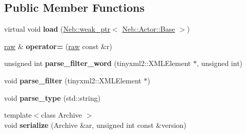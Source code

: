 \subsection*{\-Public \-Member \-Functions}
\begin{DoxyCompactItemize}
\item 
\hypertarget{classNeb_1_1Actor_1_1raw_a0fcd65e0d34cf23f105875907e84d365}{virtual void {\bfseries load} (\hyperlink{classNeb_1_1weak__ptr}{\-Neb\-::weak\-\_\-ptr}$<$ \hyperlink{classNeb_1_1Actor_1_1Base}{\-Neb\-::\-Actor\-::\-Base} $>$)}\label{classNeb_1_1Actor_1_1raw_a0fcd65e0d34cf23f105875907e84d365}

\item 
\hypertarget{classNeb_1_1Actor_1_1raw_aaa1450b77b3b9eddaed3acbeb1979f2c}{\hyperlink{classNeb_1_1Actor_1_1raw}{raw} \& {\bfseries operator=} (\hyperlink{classNeb_1_1Actor_1_1raw}{raw} const \&r)}\label{classNeb_1_1Actor_1_1raw_aaa1450b77b3b9eddaed3acbeb1979f2c}

\item 
\hypertarget{classNeb_1_1Actor_1_1raw_a4754eca5b0d5288e337c4ba427b6f22f}{unsigned int {\bfseries parse\-\_\-filter\-\_\-word} (tinyxml2\-::\-X\-M\-L\-Element $\ast$, unsigned int)}\label{classNeb_1_1Actor_1_1raw_a4754eca5b0d5288e337c4ba427b6f22f}

\item 
\hypertarget{classNeb_1_1Actor_1_1raw_a7617355596199f06b66560c6db88454c}{void {\bfseries parse\-\_\-filter} (tinyxml2\-::\-X\-M\-L\-Element $\ast$)}\label{classNeb_1_1Actor_1_1raw_a7617355596199f06b66560c6db88454c}

\item 
\hypertarget{classNeb_1_1Actor_1_1raw_a4d4ef0f585dd00e5c5a8f6e2ad4c3059}{void {\bfseries parse\-\_\-type} (std\-::string)}\label{classNeb_1_1Actor_1_1raw_a4d4ef0f585dd00e5c5a8f6e2ad4c3059}

\item 
\hypertarget{classNeb_1_1Actor_1_1raw_af7f1b94d5569b00e66b6eabc8f29f98c}{{\footnotesize template$<$class Archive $>$ }\\void {\bfseries serialize} (\-Archive \&ar, unsigned int const \&version)}\label{classNeb_1_1Actor_1_1raw_af7f1b94d5569b00e66b6eabc8f29f98c}

\end{DoxyCompactItemize}
